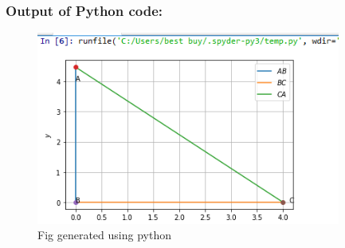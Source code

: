\documentclass[a4paper,12pt]{article}
\begin{document}
\subsubsection{Output of Python code:}
\begin{figure}[htp]
	\centering
	\includegraphics[width=10cm]{triangle.png}
	\caption{Fig generated using python}
\end{figure}
\end{document}
